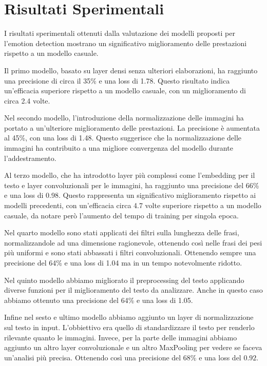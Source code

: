 \documentclass{article}
\begin{document}
\newpage

\section{Risultati Sperimentali}
I risultati sperimentali ottenuti dalla valutazione dei modelli proposti per l'emotion detection mostrano un significativo miglioramento delle prestazioni rispetto a un modello casuale. 

\bigskip

Il primo modello, basato su layer densi senza ulteriori elaborazioni, ha raggiunto una precisione di circa il 35\% e una loss di 1.78. Questo risultato indica un'efficacia superiore rispetto a un modello casuale, con un miglioramento di circa 2.4 volte.

\bigskip

Nel secondo modello, l'introduzione della normalizzazione delle immagini ha portato a un'ulteriore miglioramento delle prestazioni. La precisione è aumentata al 45\%, con una loss di 1.48. Questo suggerisce che la normalizzazione delle immagini ha contribuito a una migliore convergenza del modello durante l'addestramento.

\bigskip

Al terzo modello, che ha introdotto layer più complessi come l'embedding per il testo e layer convoluzionali per le immagini, ha raggiunto una precisione del 66\% e una loss di 0.98. Questo rappresenta un significativo miglioramento rispetto ai modelli precedenti, con un'efficacia circa 4.7 volte superiore rispetto a un modello casuale, da notare però l'aumento del tempo di training per singola epoca.

\bigskip

Nel quarto modello sono stati applicati dei filtri sulla lunghezza delle frasi, normalizzandole ad una dimensione ragionevole, ottenendo così nelle frasi dei pesi più uniformi e sono stati abbassati i filtri convoluzionali. Ottenendo sempre una precisione del 64\% e una loss di 1.04 ma in un tempo notevolmente ridotto.

\bigskip


Nel quinto modello abbiamo migliorato il preprocessing del testo applicando diverse funzioni per il miglioramento del testo da analizzare. Anche in questo caso abbiamo ottenuto una precisione del 64\% e una loss di 1.05.

\bigskip


Infine nel sesto e ultimo modello abbiamo aggiunto un layer di normalizzazione sul testo in input. L'obbiettivo era quello di standardizzare il testo per renderlo rilevante quanto le immagini. Invece, per la parte delle immagini abbiamo aggiunto un altro layer convoluzionale e un altro MaxPooling per vedere se faceva un'analisi più precisa. Ottenendo così una precisione del 68\% e una loss del $0.92$.
\end{document}
